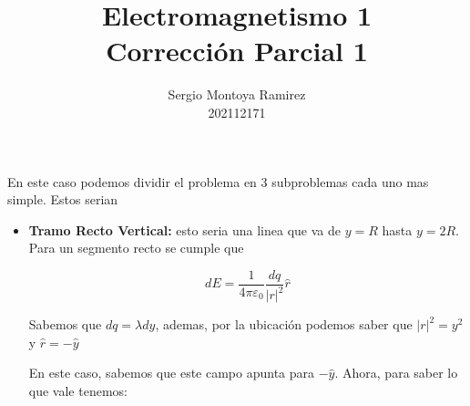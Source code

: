 \documentclass{report}
\title{\Huge{Electromagnetismo 1}\\Corrección Parcial 1}
\author{\huge{Sergio Montoya Ramirez}\\202112171}
\date{}
\begin{document}
\maketitle
\newpage%
\tableofcontents
\pagebreak

\chapter{}

En este caso podemos dividir el problema en 3 subproblemas cada uno mas simple. Estos serian

\begin{itemize}
	\item \textbf{Tramo Recto Vertical:} esto seria una linea que va de $y = R$ hasta $y = 2R$. Para un segmento recto
		se cumple que

		$$ dE = \frac{1}{4\pi\varepsilon_0}\frac{dq}{\left|r\right|^2} \hat{r} $$


		Sabemos que $dq = \lambda dy$, ademas, por la ubicación podemos saber que $\left|r\right|^2 = y^2$ y $\hat{r} = - \hat{y}$

		En este caso, sabemos que este campo apunta para $-\hat{y}$. Ahora, para saber lo que vale tenemos:


\end{itemize}
\end{document}
